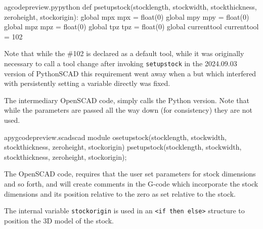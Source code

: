 \documentclass{ltxdoc}
\begin{document}
\lstset{firstnumber=\thegcpy}
\begin{writecode}{a}{gcodepreview.py}{python}
def psetupstock(stocklength, stockwidth, stockthickness, zeroheight, stockorigin):
    global mpx
    mpx = float(0)
    global mpy
    mpy = float(0)
    global mpz
    mpz = float(0)
    global tpz
    tpz = float(0)
    global currenttool
    currenttool = 102

\end{writecode}
\addtocounter{gcpy}{12}

Note that while the \#102 is declared as a default tool, while it was originally necessary 
to call a tool change after invoking \verb|setupstock| in the 2024.09.03 version of
PythonSCAD this requirement went away when a but which interfered with persistently setting 
a variable directly was fixed.

The intermediary OpenSCAD code,  simply 
calls the Python version. Note that while the parameters are passed all the way down 
(for consistency) they are not used.

\lstset{firstnumber=\thepyscad}
\begin{writecode}{a}{pygcodepreview.scad}{scad}
 module osetupstock(stocklength, stockwidth, stockthickness, zeroheight, stockorigin) {
     psetupstock(stocklength, stockwidth, stockthickness, zeroheight, stockorigin);
 }
 
\end{writecode}
\addtocounter{pyscad}{4}

The OpenSCAD code,  requires that the user set parameters
for stock dimensions and so forth, and will create comments in the G-code which incorporate 
the stock dimensions and its position relative to the zero as set relative to the stock.
 
The internal variable \verb|stockorigin| is used in an \verb|<if then else>| structure to position
the 3D model of the stock. 
\end{document}
